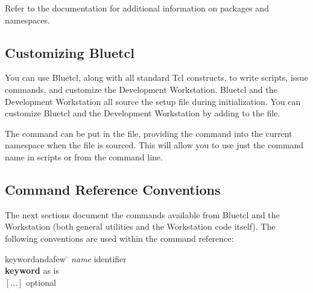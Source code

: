 Refer to the  documentation for additional information on packages
and namespaces.


\subsection{Customizing Bluetcl}
\label{custom}

You can use Bluetcl, along with all standard Tcl constructs, to
write scripts, issue commands, and customize the Development Workstation.
Bluetcl and the Development Workstation all source the setup
file  during initialization.  You can customize
Bluetcl and the Development Workstation by adding to 
 the  file.


The  command can be put in the 
file, providing the command into the current namespace when the file
is sourced.  This will allow you to use just the command name in
scripts or from the command line.


\subsection{Command Reference Conventions}

The next sections document the commands available from Bluetcl and
the Workstation (both general utilities and the Workstation code itself).
The following conventions are used within the command reference:
\begin{tabbing}
keywordandafew     \=     \kill
{\em name} \> identifier \\
{\bf keyword} \> as is \\
$[...]$ \> optional \\
\end{tabbing}

